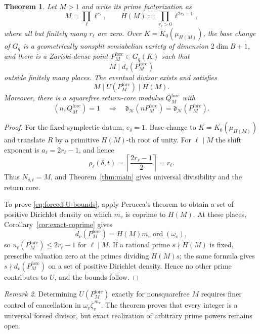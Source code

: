 \documentclass[11pt,letterpaper,reqno]{amsart}
\newtheorem{theorem}{Theorem}[section]
\theoremstyle{definition}
\theoremstyle{remark}
\newtheorem{remark}[theorem]{Remark}
\newcommand{\ord}{\operatorname{ord}}
\newcommand{\dd}{\mathfrak d}
\newcommand{\Ner}{\mathcal N}
\begin{document}
\begin{theorem}
\label{thm:arbitrary-forced-divisor}
Let $M>1$ and write its prime factorization as
\[
 M=\prod_\ell\ell^{r_\ell},
 \qquad
 H(M):=\prod_{r_\ell>0}\ell^{2r_\ell-1},
\]
where all but finitely many $r_\ell$ are zero.
Over $K=K_0(\mu_{H(M)})$, the base change of $G_q$ is a geometrically
nonsplit semiabelian variety of dimension $2\dim B+1$, and there is a
Zariski-dense point $P^{\mathrm{forc}}_M\in G_q(K)$ such that
\[
 M\mid d_v(P^{\mathrm{forc}}_M)
\]
outside finitely many places.  The eventual divisor exists and satisfies
\begin{equation}\label{eq:forced-U-bounds}
 M\mid U(P^{\mathrm{forc}}_M)\mid H(M).
\end{equation}
Moreover, there is a squarefree return-core modulus $Q_M^{\mathrm{forc}}$ with
\[
 (n,Q_M^{\mathrm{forc}})=1
 \quad\Longrightarrow\quad
 \dd_{\Ner}(nP^{\mathrm{forc}}_M)
 =\dd_{\Ner}(P^{\mathrm{forc}}_M).
\]
\end{theorem}

\begin{proof}
For the fixed symplectic datum, $e_\delta=1$.  Base-change to
$K=K_0(\mu_{H(M)})$ and translate $R$ by
a primitive $H(M)$-th root of unity.  For $\ell\mid M$ the shift exponent is
$a_\ell=2r_\ell-1$, and hence
\[
 \rho_\ell(\delta,t)
 =\left\lceil\frac{2r_\ell-1}{2}\right\rceil=r_\ell.
\]
Thus $N_{\delta,t}=M$, and Theorem~\ref{thm:main} gives universal divisibility and
the return core.

To prove \eqref{eq:forced-U-bounds}, apply Perucca's theorem to obtain a
set of positive Dirichlet density on which $m_v$ is coprime to $H(M)$.
At these places,
Corollary~\ref{cor:exact-coprime} gives
\[
 d_v(P^{\mathrm{forc}}_M)=H(M)m_v\ord(\omega_v),
\]
so $u_\ell(P^{\mathrm{forc}}_M)\le2r_\ell-1$ for $\ell\mid M$.  If a
rational prime $s\nmid H(M)$ is fixed, prescribe valuation zero at the primes
dividing $H(M)s$; the same formula gives
$s\nmid d_v(P^{\mathrm{forc}}_M)$ on a set of positive Dirichlet density.
Hence no other prime contributes to $U$, and the bounds follow.
\end{proof}

\begin{remark}
Determining $U(P^{\mathrm{forc}}_M)$ exactly for nonsquarefree $M$ requires
finer control of cancellation in
$\omega_v\overline\zeta_v^{\,m_v}$.  The theorem proves that every integer is
a universal forced divisor, but exact realization of arbitrary prime powers
remains open.
\end{remark}
\end{document}
